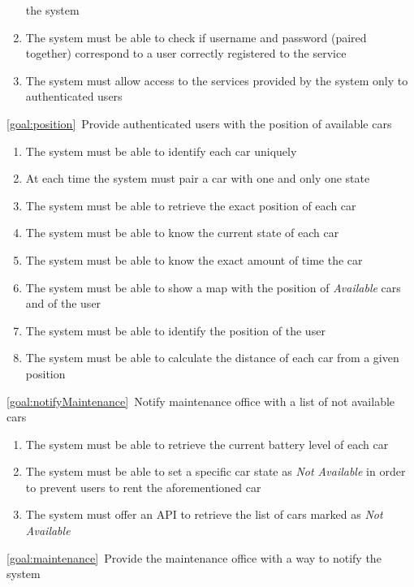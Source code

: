 \begin{description}
\begin{enumerate}[resume*]
  				the system
   				\item The system must be able to check if username and password (paired together)
   				correspond to a user correctly registered to the service
   				\item The system must allow access to the services provided by the system only to
   				authenticated users 
			\end{enumerate}
		\item \ref{goal:position}\ Provide authenticated users with the position of available cars
			\begin{enumerate}[resume*]
				\item The system must be able to identify each car uniquely
			 	\item At each time the system must pair a car with one and only one state
  				\item The system must be able to retrieve the exact position of each car
   				\item The system must be able to know the current state of each car
   				\item The system must be able to know the exact amount of time the car 
   				\item The system must be able to show a map with the position of \textit{Available} cars
   				and of the user
  				\item The system must be able to identify the position of the user
   				\item The system must be able to calculate the distance of each car from a given position
  			\end{enumerate}
		\item \ref{goal:notifyMaintenance}\ Notify maintenance office with a list of not available cars
			\begin{enumerate}[resume*]
   				\item The system must be able to retrieve the current battery level of each car
   				\item The system must be able to set a specific car state as \textit{Not Available} in order
   				to prevent users to rent the aforementioned car
   				\item The system must offer an API to retrieve the list of cars marked as \textit{Not
   				Available}
  			\end{enumerate}
		\item \ref{goal:maintenance}\ Provide the maintenance office with a way to notify the system

\end{description}
